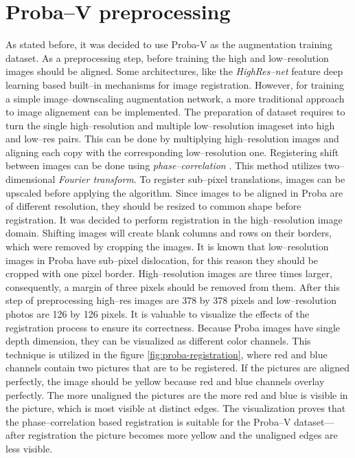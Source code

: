 \section{Proba--V preprocessing}
As stated before, it was decided to use Proba-V as the augmentation training dataset.
As a preprocessing step, before training the high and low--resolution images should be aligned.
Some architectures, like the \textit{HighRes--net} feature deep learning based built--in mechanisms for image registration.
However, for training a simple image--downscaling augmentation network, a more traditional approach to image alignement can be implemented.
The preparation of dataset requires to turn the single high--resolution and multiple low--resolution imageset into high and low--res pairs.
This can be done by multiplying high--resolution images and aligning each copy with the corresponding low--resolution one.
Registering shift between images can be done using \textit{phase--correlation} \cite{guizar-2008-registration}.
This method utilizes two--dimensional \textit{Fourier transform}.
To register sub--pixel translations, images can be upscaled before applying the algorithm.
Since images to be aligned in Proba are of different resolution, they should be resized to common shape before registration.
It was decided to perform registration in the high--resolution image domain.
Shifting images will create blank columns and rows on their borders, which were removed by cropping the images.
It is known that low--resolution images in Proba have sub--pixel dislocation, for this reason they should be cropped with one pixel border.
High--resolution images are three times larger, consequently, a margin of three pixels should be removed from them.
After this step of preprocessing high--res images are 378 by 378 pixels and low--resolution photos are 126 by 126 pixels.
It is valuable to visualize the effects of the registration process to ensure its correctness.
Because Proba images have single depth dimension, they can be visualized as different color channels.
This technique is utilized in the figure \ref{fig:proba-registration}, where red and blue channels contain two pictures that are to be registered.
If the pictures are aligned perfectly, the image should be yellow because red and blue channels overlay perfectly.
The more unaligned the pictures are the more red and blue is visible in the picture, which is most visible at distinct edges.
The visualization proves that the phase--correlation based registration is suitable for the Proba--V dataset---after registration the picture becomes more yellow and the unaligned edges are less visible.
